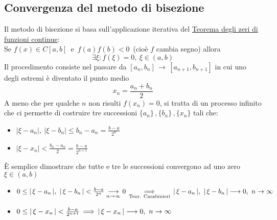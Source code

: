 \subsection{Convergenza del metodo di bisezione}
Il metodo di bisezione si basa sull'applicazione iterativa del \underline{Teorema degli zeri di funzioni continue}:\\
Se $f(x) \in C[a,b]\,$ e $\,f(a)f(b)<0 \,$ (cioè $f$ cambia segno) allora
\[\exists \xi : f(\xi)=0, \ \xi \in (a,b)\]
Il procedimento consiste nel passare da $[a_n,b_n] \, \rightarrow \, [a_{n+1},b_{n+1}]$ in cui uno degli estremi è diventato il punto medio
\[
x_n=\frac{a_n+b_n}{2}
\]
A meno che per qualche $n$ non risulti $f(x_n)=0$, si tratta di un processo infinito che ci permette di costruire tre successioni $\{a_n\}\,,\{b_n\}\,,\{x_n\}$ tali che:
\begin{itemize}
    \item $|\xi - a_n|, \ |\xi - b_n| \leq b_n-a_n=\frac{b-a}{2^n}$
	\item $|\xi - x_n| < \frac{b_n - a_n}{2} = \frac{b-a}{2^{n+1}}$
\end{itemize}
È semplice dimostrare che tutte e tre le successioni convergono ad uno zero $\xi \in (a,b)$
\begin{itemize}
	\item $0 \le \abs{\,\xi - a_n\,}, \ \abs{\,\xi - b_n\,} < \frac{b-a}{2^n}\underset{n\to \infty}{\longrightarrow}  0 \, \underset{\text{Teor. Carabinieri}}{\Longrightarrow} \, \abs{\,\xi - a_n\,}, \ \abs{\,\xi - b_n\,} \longrightarrow 0, \ n \rightarrow \infty$
	\item $0 \le \lvert\,\xi - x_n\,\rvert < \frac{b-a}{2^{n+1}} \, \Longrightarrow \,\lvert\,\xi - x_n\,\rvert \longrightarrow 0, \ n \rightarrow \infty$
\end{itemize}
